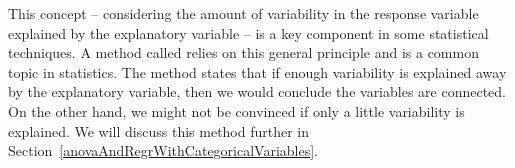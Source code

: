 This concept -- considering the amount of variability in the response variable explained by the explanatory variable -- is a key component in some statistical techniques. A method called  relies on this general principle and is a common topic in statistics. The method states that if enough variability is explained away by the explanatory variable, then we would conclude the variables are connected. On the other hand, we might not be convinced if only a little variability is explained. We will discuss this method further in Section~\ref{anovaAndRegrWithCategoricalVariables}.






